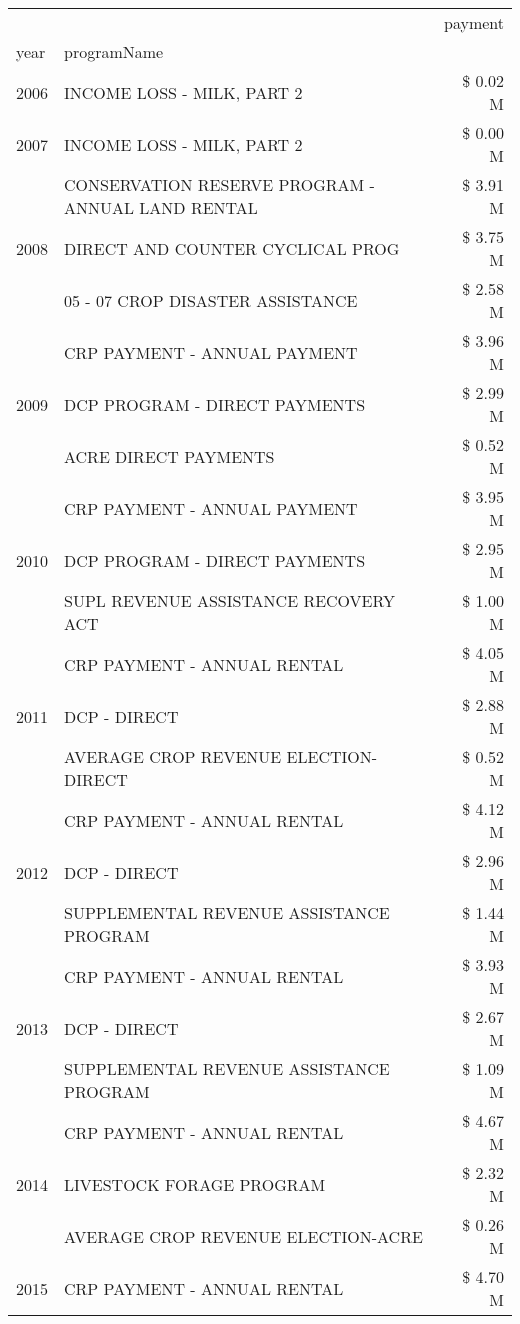 \begin{tabular}{llr}
\toprule
 &  & payment \\
year & programName &  \\
\midrule
2006 & INCOME LOSS - MILK, PART 2 & \$ 0.02 M \\
\cline{1-3}
2007 & INCOME LOSS - MILK, PART 2 & \$ 0.00 M \\
\cline{1-3}
\multirow[t]{3}{*}{2008} & CONSERVATION RESERVE PROGRAM - ANNUAL LAND RENTAL & \$ 3.91 M \\
 & DIRECT AND COUNTER CYCLICAL PROG & \$ 3.75 M \\
 & 05 - 07 CROP DISASTER ASSISTANCE & \$ 2.58 M \\
\cline{1-3}
\multirow[t]{3}{*}{2009} & CRP PAYMENT - ANNUAL PAYMENT & \$ 3.96 M \\
 & DCP PROGRAM - DIRECT PAYMENTS & \$ 2.99 M \\
 & ACRE DIRECT PAYMENTS & \$ 0.52 M \\
\cline{1-3}
\multirow[t]{3}{*}{2010} & CRP PAYMENT - ANNUAL PAYMENT & \$ 3.95 M \\
 & DCP PROGRAM - DIRECT PAYMENTS & \$ 2.95 M \\
 & SUPL REVENUE ASSISTANCE RECOVERY ACT & \$ 1.00 M \\
\cline{1-3}
\multirow[t]{3}{*}{2011} & CRP PAYMENT - ANNUAL RENTAL & \$ 4.05 M \\
 & DCP - DIRECT & \$ 2.88 M \\
 & AVERAGE CROP REVENUE ELECTION-DIRECT & \$ 0.52 M \\
\cline{1-3}
\multirow[t]{3}{*}{2012} & CRP PAYMENT - ANNUAL RENTAL & \$ 4.12 M \\
 & DCP - DIRECT & \$ 2.96 M \\
 & SUPPLEMENTAL REVENUE ASSISTANCE PROGRAM & \$ 1.44 M \\
\cline{1-3}
\multirow[t]{3}{*}{2013} & CRP PAYMENT - ANNUAL RENTAL & \$ 3.93 M \\
 & DCP - DIRECT & \$ 2.67 M \\
 & SUPPLEMENTAL REVENUE ASSISTANCE PROGRAM & \$ 1.09 M \\
\cline{1-3}
\multirow[t]{3}{*}{2014} & CRP PAYMENT - ANNUAL RENTAL & \$ 4.67 M \\
 & LIVESTOCK FORAGE PROGRAM & \$ 2.32 M \\
 & AVERAGE CROP REVENUE ELECTION-ACRE & \$ 0.26 M \\
\cline{1-3}
\multirow[t]{3}{*}{2015} & CRP PAYMENT - ANNUAL RENTAL & \$ 4.70 M \\

\end{tabular}
